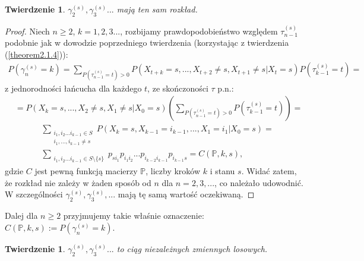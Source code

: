 \documentclass[a4paper]{article}
\theoremstyle{defn}
\theoremstyle{theorem}
\newtheorem{theorem}[defn]{Twierdzenie}
\theoremstyle{lemma}
\theoremstyle{cor}
\theoremstyle{fact}
\begin{document}
\begin{theorem}\label{theorem2.5.8}
$\gamma_2^{(s)}, \gamma_3^{(s)}...$ mają ten sam rozkład.
\end{theorem}
\begin{proof}
Niech $n\geq 2$, $k = 1,2,3...$, rozbijamy prawdopodobieństwo względem $\tau_{n-1}^{(s)}$ podobnie jak w dowodzie poprzedniego twierdzenia (korzystając z twierdzenia (\ref{theorem2.1.4})):\\
\begin{align*}
    P(\gamma_n^{(s)} = k) = \sum\limits_{P(\tau_{n-1}^{(s)} = t) > 0} P(X_{t+k} = s, ..., X_{t+2} \neq s, X_{t+1} \neq s| X_t = s)P(\tau_{k-1}^{(s)} = t) =
\end{align*}
z jednorodności łańcucha dla każdego $t$, ze skończoności $\tau$ p.n.:
\begin{align*}
    &=P(X_{k} = s, ..., X_{2} \neq s, X_{1} \neq s| X_0 = s) \left(\sum\limits_{P(\tau_{n-1}^{(s)} = t) > 0} P(\tau_{k-1}^{(s)} = t)\right) =
\end{align*}
\begin{align*}
    &\sum\limits_{\substack{i_1, i_2 ... i_{k-1} \in S\\ i_1,...,i_{k-1} \neq s}} P(X_{k} = s, X_{k-1} = i_{k-1}, ..., X_{1} = i_1 | X_0 = s)=\\
    &\sum\limits_{\substack{i_1, i_2 ... i_{k-1} \in S\setminus \{s\}}} p_{si_1}p_{i_1 i_2}...p_{i_{k-2}i_{k-1}} p_{i_{k-1} s} = C(\mathbb{P}, k, s),
\end{align*}
gdzie $C$ jest pewną funkcją macierzy $\mathbb{P}$, liczby kroków $k$ i stanu $s$.
Widać zatem, że rozkład nie zależy w żaden sposób od $n$ dla $n = 2, 3,...$, co należało udowodnić. W szczególności $\gamma_2^{(s)}, \gamma_3^{(s)}, ...$ mają tę samą wartość oczekiwaną. 
\end{proof}
Dalej dla $n\geq 2$ przyjmujemy takie właśnie oznaczenie: $C(\mathbb{P}, k, s) := P(\gamma_n^{(s)} = k)$.
\begin{theorem}\label{theorem2.5.9}
$\gamma_2^{(s)}, \gamma_3^{(s)}...$ to ciąg niezależnych zmiennych losowych.
\end{theorem}
\end{document}

